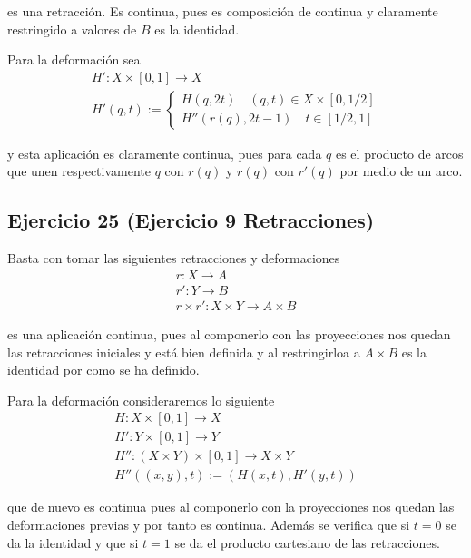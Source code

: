 \documentclass{article}
\begin{document}
es una retracción. Es continua, pues es composición de continua y claramente restringido a valores de $B$ es la identidad.

Para la deformación sea
\begin{gather*}
H':X\times [0,1]\rightarrow X\\
H'(q,t):=\left\lbrace \begin{array}{c}
H(q,2t)\quad (q,t)\in X\times[0,1/2]\\
H''(r(q),2t-1)\quad t\in [1/2,1]
\end{array}\right.
\end{gather*}

y esta aplicación es claramente continua, pues para cada $q$ es el producto de arcos que unen  respectivamente $q$ con $r(q)$ y $r(q)$ con $r'(q)$ por medio de un arco.

\subsection{Ejercicio 25 (Ejercicio 9 Retracciones)}
Basta con tomar las siguientes retracciones y deformaciones
\begin{gather*}
r:X\rightarrow A\\
r':Y\rightarrow B\\
r\times r':X\times Y \rightarrow A\times B
\end{gather*}

es una aplicación continua, pues al componerlo con las proyecciones nos quedan las retracciones iniciales y está bien definida y al restringirloa a $A\times B$ es la identidad por como se ha definido.

Para la deformación consideraremos lo siguiente
\begin{gather*}
H:X\times [0,1]\rightarrow X\\
H':Y\times [0,1]\rightarrow Y\\
H'':(X\times Y)\times [0,1]\rightarrow X\times Y\\
H''((x,y),t):=(H(x,t),H'(y,t))
\end{gather*}

que de nuevo es continua pues al componerlo con la proyecciones nos quedan las deformaciones previas y por tanto es continua. Además se verifica que si $t=0$ se da la identidad y que si $t=1$ se da el producto cartesiano de las retracciones.
\end{document}
